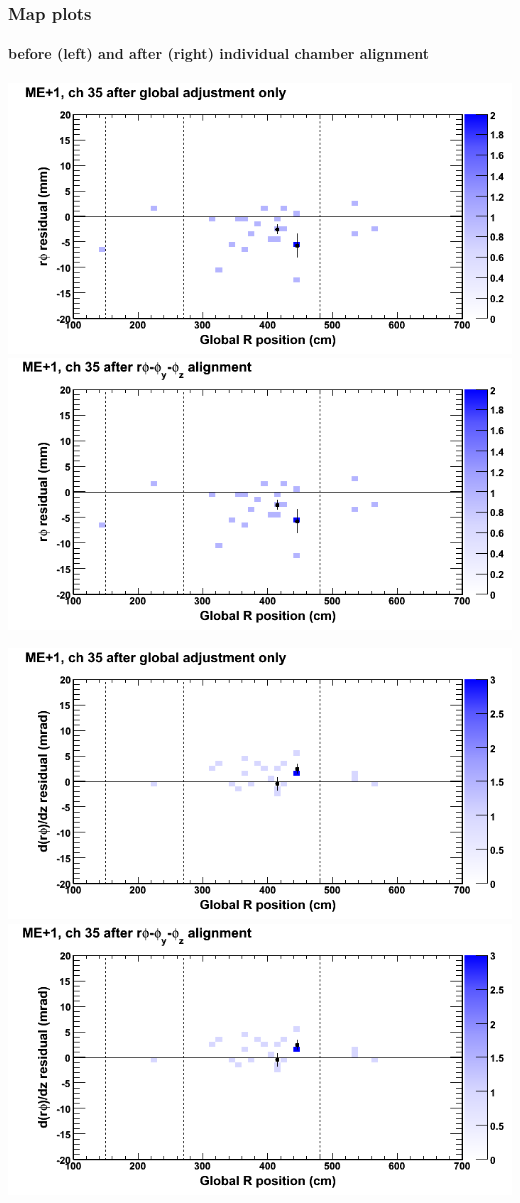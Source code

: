 \documentclass[compress]{beamer}
\begin{document}
\begin{frame}
\frametitle{Map plots}
\framesubtitle{before (left) and after (right) individual chamber alignment}
\includegraphics[width=0.5\linewidth]{ringmapplots_3dof/before_CSCvsr_mep1ch35_x.png} \includegraphics[width=0.5\linewidth]{ringmapplots_3dof/after_CSCvsr_mep1ch35_x.png}

\includegraphics[width=0.5\linewidth]{ringmapplots_3dof/before_CSCvsr_mep1ch35_dxdz.png} \includegraphics[width=0.5\linewidth]{ringmapplots_3dof/after_CSCvsr_mep1ch35_dxdz.png}
\end{frame}
\end{document}
